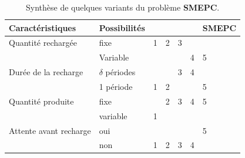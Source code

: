 	\begin{table}[H]
		\begin{center}
			
			\begin{tabular}{|l|l|l|l|l|l|l|}
				\hline
				Caractéristiques & Possibilités &  &&&&SMEPC\\ \hline
				Quantité rechargée & fixe & 1&2&3&& \\
				& Variable &  &&&4&5\\\hline
				Durée de la recharge &  $\delta$ périodes &  &&3&4&\\
				& 1 période & 1&2&&&5\\\hline
				Quantité produite &fixe &  &2&3&4&5\\%
				& variable &1  &&&&\\
				\hline
				Attente avant recharge & oui & &&&&5\\
				& non & 1&2&3&4&\\
				\hline
			\end{tabular}
		\end{center}
		\caption[Synthèse de quelques variants du problème SMEPC ]{Synthèse de quelques variants du problème \textbf{SMEPC}.\label{syn_variant} }
	\end{table}
	
	
	
	
